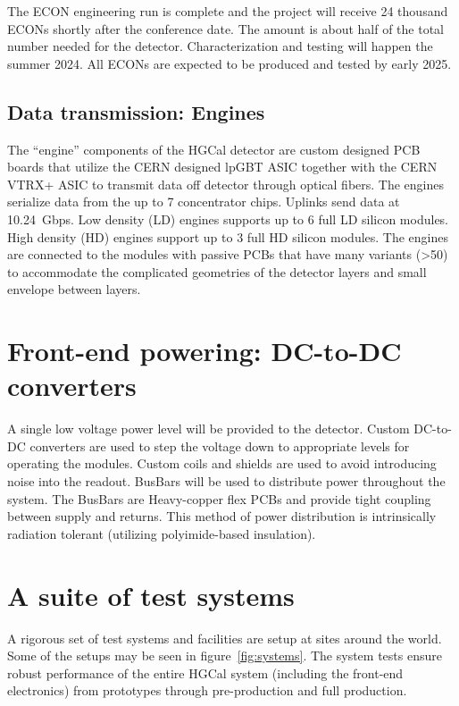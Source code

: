 \documentclass[twocolumn]{webofc}
\begin{document}
The ECON engineering run is complete and the project will receive 24 thousand ECONs shortly after the conference date. The amount is about half of the total number needed for the detector. Characterization and testing will happen the summer 2024. All ECONs are expected to be produced and tested by early 2025.

\subsection{Data transmission: Engines}
\label{sec:eng}

The ``engine'' components of the HGCal detector are custom designed PCB boards that utilize the CERN designed lpGBT ASIC together with the CERN VTRX+ ASIC to transmit data off detector through optical fibers. The engines serialize data from the up to 7 concentrator chips. Uplinks send data at 10.24~Gbps. Low density (LD) engines supports up to 6 full LD silicon modules. High density (HD) engines support up to 3 full HD silicon modules. The engines are connected to the modules with passive PCBs that have many variants (>50) to accommodate the complicated geometries of the detector layers and small envelope between layers.

\section{Front-end powering: DC-to-DC converters}
\label{sec:power}

A single low voltage power level will be provided to the detector. Custom DC-to-DC converters are used to step the voltage down to appropriate levels for operating the modules. Custom coils and shields are used to avoid introducing noise into the readout. BusBars will be used to distribute power throughout the system. The BusBars are Heavy-copper flex PCBs and provide tight coupling between supply and returns. This method of power distribution is intrinsically radiation tolerant (utilizing polyimide-based insulation).

\section{A suite of test systems}
\label{sec:systems}

A rigorous set of test systems and facilities are setup at sites around the world. Some of the setups may be seen in figure~\ref{fig:systems}.
The system tests ensure robust performance of the entire HGCal system (including the front-end electronics) from prototypes through pre-production and full production.
\end{document}
